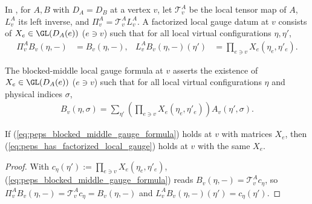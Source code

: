 \begin{definition}%
    \label{def:peps_hasFactorizedLocalGauge}
    \leanok
    In \cite[Section~3]{Molnar2018NormalPEPS}, for $A,B$ with $D_A=D_B$ at a vertex $v$, let $\mathcal T^A_v$ be the local tensor map of $A$, $L^A_v$ its left inverse, and $\Pi^A_v=\mathcal T^A_vL^A_v$. A factorized local gauge datum at $v$ consists of $X_e\in\GL(D_A(e))$ ($e\ni v$) such that for all local virtual configurations $\eta,\eta'$,
    \begin{align}
        \Pi^A_v B_v(\eta,-)
         & =B_v(\eta,-),                       &
        L^A_vB_v(\eta,-)(\eta')
         & =\prod_{e\ni v}X_e(\eta_e,\eta'_e).
        \label{eq:peps_has_factorized_local_gauge}
    \end{align}
\end{definition}

\begin{definition}%
    \label{def:peps_blockedMiddleGaugeFormula}
    \leanok
    The blocked-middle local gauge formula at $v$ asserts the existence of $X_e\in\GL(D_A(e))$ ($e\ni v$) such that for all local virtual configurations $\eta$ and physical indices $\sigma$,
    \begin{align}
        B_v(\eta,\sigma)
        =
        \sum_{\eta'}
        \left(\prod_{e\ni v}X_e(\eta_e,\eta'_e)\right)
        A_v(\eta',\sigma).
        \label{eq:peps_blocked_middle_gauge_formula}
    \end{align}
\end{definition}

\begin{lemma}%
    \label{thm:peps_hasFactorizedLocalGauge_of_blockedMiddleGaugeFormula}
    \leanok
    If (\ref{eq:peps_blocked_middle_gauge_formula}) holds at $v$ with matrices $X_e$, then (\ref{eq:peps_has_factorized_local_gauge}) holds at $v$ with the same $X_e$.
\end{lemma}
\begin{proof}\leanok
    With $c_\eta(\eta'):=\prod_{e\ni v}X_e(\eta_e,\eta'_e)$, (\ref{eq:peps_blocked_middle_gauge_formula}) reads $B_v(\eta,-)=\mathcal T^A_vc_\eta$, so $\Pi^A_vB_v(\eta,-)=\mathcal T^A_vc_\eta=B_v(\eta,-)$ and $L^A_vB_v(\eta,-)(\eta')=c_\eta(\eta')$.
\end{proof}

